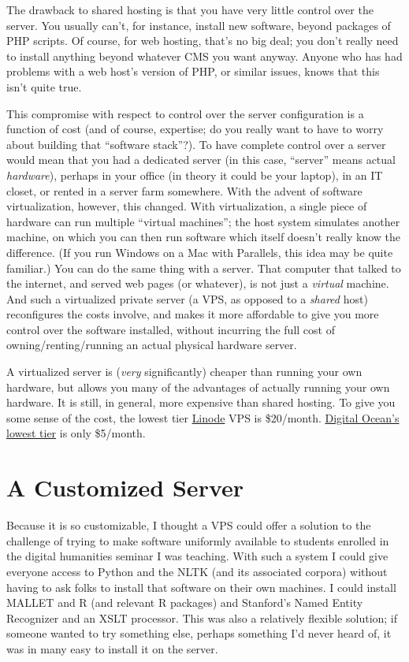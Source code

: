 \documentclass[
  12pt,
]{article}
\begin{document}
The drawback to shared hosting is that you have very little control over
the server. You usually can't, for instance, install new software,
beyond packages of PHP scripts. Of course, for web hosting, that's no
big deal; you don't really need to install anything beyond whatever CMS
you want anyway. {Anyone who has had problems with a web host's version
of PHP, or similar issues, knows that this isn't quite true.}

This compromise with respect to control over the server configuration is
a function of cost (and of course, expertise; do you really want to have
to worry about building that ``software stack''?). To have complete
control over a server would mean that you had a dedicated server (in
this case, ``server'' means actual \emph{hardware}), perhaps in your
office (in theory it could be your laptop), in an IT closet, or rented
in a server farm somewhere. With the advent of software virtualization,
however, this changed. With virtualization, a single piece of hardware
can run multiple ``virtual machines''; the host system simulates another
machine, on which you can then run software which itself doesn't really
know the difference. (If you run Windows on a Mac with Parallels, this
idea may be quite familiar.) You can do the same thing with a server.
That computer that talked to the internet, and served web pages (or
whatever), is not just a \emph{virtual} machine. And such a virtualized
private server (a VPS, as opposed to a \emph{shared} host) reconfigures
the costs involve, and makes it more affordable to give you more control
over the software installed, without incurring the full cost of
owning/renting/running an actual physical hardware server.

A virtualized server is (\emph{very} significantly) cheaper than running
your own hardware, but allows you many of the advantages of actually
running your own hardware. It is still, in general, more expensive than
shared hosting. To give you some sense of the cost, the lowest tier
\href{https://www.linode.com/}{Linode} VPS is \$20/month.
\href{https://www.digitalocean.com/pricing}{Digital Ocean's lowest tier}
is only \$5/month.

\hypertarget{a-customized-server}{%
\section{A Customized Server}\label{a-customized-server}}

Because it is so customizable, I thought a VPS could offer a solution to
the challenge of trying to make software uniformly available to students
enrolled in the digital humanities seminar I was teaching. With such a
system I could give everyone access to Python and the NLTK (and its
associated corpora) without having to ask folks to install that software
on their own machines. I could install MALLET and R (and relevant R
packages) and Stanford's Named Entity Recognizer and an XSLT processor.
This was also a relatively flexible solution; if someone wanted to try
something else, perhaps something I'd never heard of, it was in many
easy to install it on the server.
\end{document}
